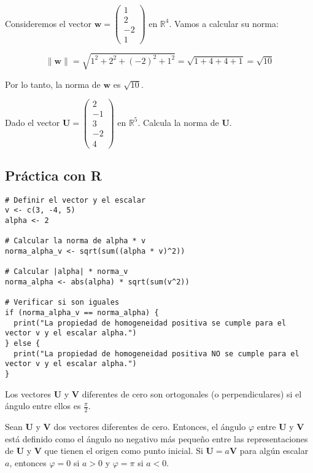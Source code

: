 \begin{example}
 Consideremos el vector $\mathbf{w} = \begin{pmatrix} 1 \\ 2 \\ -2 \\ 1 \end{pmatrix}$ en $\mathbb{R}^4$. Vamos a calcular su norma:

\[
\|\mathbf{w}\| = \sqrt{1^2 + 2^2 + (-2)^2 + 1^2} = \sqrt{1 + 4 + 4 + 1} = \sqrt{10}
\]

Por lo tanto, la norma de $\mathbf{w}$ es $\sqrt{10}$.   
\end{example}

\begin{exercise}
Dado el vector $\mathbf{U} = \begin{pmatrix} 2 \\ -1 \\ 3 \\ -2 \\ 4 \end{pmatrix}$ en $\mathbb{R}^5$. Calcula la norma de $\mathbf{U}$.
\end{exercise}
\subsection{Práctica con R}
\begin{verbatim}
# Definir el vector y el escalar
v <- c(3, -4, 5)
alpha <- 2

# Calcular la norma de alpha * v
norma_alpha_v <- sqrt(sum((alpha * v)^2))

# Calcular |alpha| * norma_v
norma_alpha <- abs(alpha) * sqrt(sum(v^2))

# Verificar si son iguales
if (norma_alpha_v == norma_alpha) {
  print("La propiedad de homogeneidad positiva se cumple para el vector v y el escalar alpha.")
} else {
  print("La propiedad de homogeneidad positiva NO se cumple para el vector v y el escalar alpha.")
}    
\end{verbatim}
\begin{definition}
 Los vectores $\mathbf{U}$ y $\mathbf{V}$ diferentes de cero son ortogonales (o perpendiculares) si el ángulo entre ellos es $\frac{\pi}{2}$.
\end{definition}

\begin{definition}
    Sean $\mathbf{U}$ y $\mathbf{V}$ dos vectores diferentes de cero. Entonces, el ángulo $\varphi$ entre $\mathbf{U}$ y $\mathbf{V}$ está definido como el ángulo no negativo más pequeño entre las representaciones de $\mathbf{U}$ y $\mathbf{V}$ que tienen el origen como punto inicial. Si $\mathbf{U} = a\mathbf{V}$ para algún escalar $a$, entonces $\varphi = 0$ si $a > 0$ y $\varphi= \pi$ si $a < 0$.
\end{definition}

